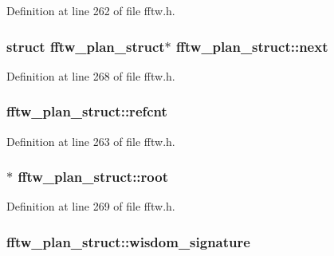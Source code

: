Definition at line 262 of file fftw.\+h.

\subsubsection[{\texorpdfstring{next}{next}}]{\setlength{\rightskip}{0pt plus 5cm}struct {\bf fftw\+\_\+plan\+\_\+struct}$\ast$ fftw\+\_\+plan\+\_\+struct\+::next}\hypertarget{structfftw__plan__struct_a626c58bf93a8b08eba8826ecc0c48781}{}\label{structfftw__plan__struct_a626c58bf93a8b08eba8826ecc0c48781}


Definition at line 268 of file fftw.\+h.

\subsubsection[{\texorpdfstring{refcnt}{refcnt}}]{ fftw\+\_\+plan\+\_\+struct\+::refcnt}\hypertarget{structfftw__plan__struct_a0f0cfe0f1312f8e5cfe2d4119070e547}{}\label{structfftw__plan__struct_a0f0cfe0f1312f8e5cfe2d4119070e547}


Definition at line 263 of file fftw.\+h.

\subsubsection[{\texorpdfstring{root}{root}}]{$\ast$ fftw\+\_\+plan\+\_\+struct\+::root}\hypertarget{structfftw__plan__struct_a3dd4d10e8be63c41d51cf5f021501bd0}{}\label{structfftw__plan__struct_a3dd4d10e8be63c41d51cf5f021501bd0}


Definition at line 269 of file fftw.\+h.

\subsubsection[{\texorpdfstring{wisdom\+\_\+signature}{wisdom_signature}}]{ fftw\+\_\+plan\+\_\+struct\+::wisdom\+\_\+signature}\hypertarget{structfftw__plan__struct_ac742b7d89ff272d35384c0fd4d82e332}{}\label{structfftw__plan__struct_ac742b7d89ff272d35384c0fd4d82e332}


